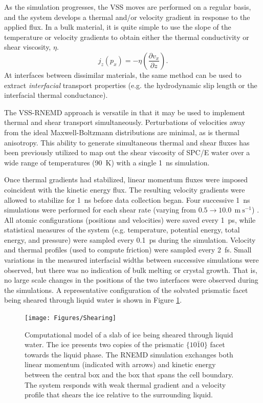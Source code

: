 As the simulation progresses, the VSS moves are performed on a regular
basis, and the system develops a thermal and/or velocity gradient in
response to the applied flux.  In a bulk material, it is quite simple
to use the slope of the temperature or velocity gradients to obtain
either the thermal conductivity or shear viscosity,
$\eta$.\cite{Bordat2002a}
\begin{equation}
\label{eq:viscosity}
j_z(p_x) = -\eta \left(\frac{\partial v_x}{\partial z}\right).
\end{equation}
At interfaces between dissimilar materials, the same method can be
used to extract \textit{interfacial} transport properties (e.g. the
hydrodynamic slip length or the interfacial thermal
conductance).


The VSS-RNEMD approach is versatile in that it may be used to
implement thermal and shear transport simultaneously.  Perturbations
of velocities away from the ideal Maxwell-Boltzmann distributions are
minimal, as is thermal anisotropy.  This ability to generate
simultaneous thermal and shear fluxes has been previously utilized to
map out the shear viscosity of SPC/E water over a wide range of
temperatures (90~K) with a single 1~ns simulation.\cite{Kuang12}

Once thermal gradients had stabilized, linear momentum fluxes were
imposed coincident with the kinetic energy flux. The resulting
velocity gradients were allowed to stabilize for 1~ns before data
collection began. Four successive 1~ns simulations were performed for
each shear rate (varying from
$0.5 \rightarrow 10.0~\mathrm{~m~s}^{-1}$) . All atomic configurations
(positions and velocities) were saved every 1~ps, while statistical
measures of the system (e.g. temperature, potential energy, total
energy, and pressure) were sampled every 0.1~ps during the
simulation. Velocity and thermal profiles (used to compute friction)
were sampled every 2~fs. Small variations in the measured interfacial
widths between successive simulations were observed, but there was no
indication of bulk melting or crystal growth. That is, no large scale
changes in the positions of the two interfaces were observed during
the simulations. A representative configuration of the solvated
prismatic facet being sheared through liquid water is shown in Figure
\ref{fig:Shearing}.

\begin{figure}
\texttt{[image: Figures/Shearing]}
\caption{\label{fig:Shearing} Computational model of a slab of ice
  being sheared through liquid water.  The ice presents two copies of
  the prismatic $\{10\bar{1}0\}$ facet towards the liquid phase.  The
  RNEMD simulation exchanges both linear momentum (indicated with
  arrows) and kinetic energy between the central box and the box that
  spans the cell boundary.  The system responds with weak thermal
  gradient and a velocity profile that shears the ice relative to the
  surrounding liquid.}
\end{figure}


